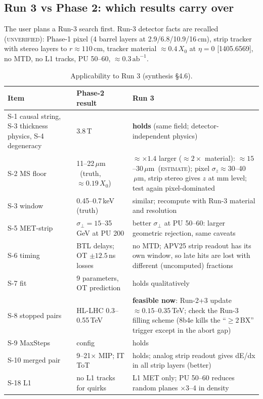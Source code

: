 \documentclass[11pt,a4paper]{article}
\newcommand{\EST}{\textsc{estimate}}
\newcommand{\UNV}{\textsc{unverified}}
\newcommand{\abinv}{\ensuremath{\,\mathrm{ab}^{-1}}}
\newcommand{\um}{\ensuremath{\,\mu\mathrm{m}}}
\begin{document}
\subsection{Run 3 vs Phase 2: which results carry over}
The user plans a Run-3 search first. Run-3 detector facts are recalled (\UNV{}): Phase-1 pixel (4 barrel layers at 2.9/6.8/10.9/16\,cm), strip tracker with stereo layers to $r\approx110$\,cm, tracker material $\approx0.4\,X_0$ at $\eta=0$ [1405.6569], no MTD, no L1 tracks, PU 50--60, $\approx0.3\abinv$.
{\footnotesize
\begin{longtable}{@{}L{3.6cm}L{4.0cm}L{8.6cm}@{}}
\caption{Applicability to Run 3 (synthesis \S4.6).}\label{tab:run3}\\
\toprule Item & Phase-2 result & Run 3\\\midrule\endfirsthead
\bottomrule\endfoot
S-1 causal string, S-3 thickness physics, S-4 degeneracy & 3.8\,T & \textbf{holds} (same field; detector-independent physics)\\
S-2 MS floor & 11--22\um\ (truth, $\approx0.19\,X_0$) & $\approx\times1.4$ larger ($\approx2\times$ material): $\approx15$--30\um\ (\EST{}); pixel $\sigma_z\approx30$--40\um, strip stereo gives $z$ at mm level; test again pixel-dominated\\
S-3 window & 0.45--0.7\,keV (truth) & similar; recompute with Run-3 material and resolution\\
S-5 MET-strip & $\sigma_\perp=15$--35\,GeV at PU 200 & better $\sigma_\perp$ at PU 50--60: larger geometric rejection, same caveats\\
S-6 timing & BTL delays; OT $\pm12.5$\,ns losses & no MTD; APV25 strip readout has its own window, so late hits are lost with different (uncomputed) fractions\\
S-7 fit & 9 parameters, OT prediction & holds qualitatively\\
S-8 stopped pairs & HL-LHC 0.3--0.55\,TeV & \textbf{feasible now}: Run-2+3 update $\approx0.15$--0.35\,TeV; check the Run-3 filling scheme (8b4e kills the ``$\ge2$\,BX'' trigger except in the abort gap)\\
S-9 MaxSteps & config & holds\\
S-10 merged pair & 9--21$\times$ MIP; IT ToT & holds; analog strip readout gives dE/dx in all strip layers (better)\\
S-18 L1 & no L1 tracks for quirks & L1 MET only; PU 50--60 reduces random planes $\times3$--4 in density\\
\end{longtable}
}
\end{document}
